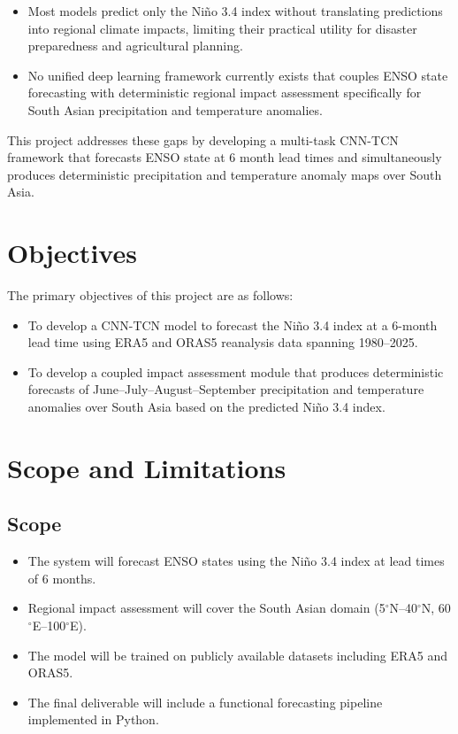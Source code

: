 \begin{itemize}
    \item Most models predict only the Ni\~{n}o 3.4 index 
    without translating predictions into regional climate 
    impacts, limiting their practical utility for 
    disaster preparedness and agricultural planning.
    
    \item No unified deep learning framework currently exists 
    that couples ENSO state forecasting with deterministic 
    regional impact assessment specifically for South Asian 
    precipitation and temperature anomalies.
\end{itemize}

This project addresses these gaps by developing a multi-task 
CNN-TCN framework that forecasts ENSO state at 6 month lead times 
and simultaneously produces deterministic precipitation and 
temperature anomaly maps over South Asia.

\section{Objectives}
The primary objectives of this project are as follows:
\begin{itemize}
    \item To develop a CNN-TCN model to forecast the 
    Ni\~{n}o 3.4 index at a 6-month lead time using 
    ERA5 and ORAS5 reanalysis data spanning 1980--2025.
    
    \item To develop a coupled impact assessment module 
    that produces deterministic forecasts of 
    June--July--August--September precipitation 
    and temperature anomalies over South Asia based on 
    the predicted Ni\~{n}o 3.4 index.
\end{itemize}

\section{Scope and Limitations}

\subsection{Scope}
\begin{itemize}
    \item The system will forecast ENSO states using the Ni\~{n}o 3.4 index at lead times of 6 months.
    \item Regional impact assessment will cover the South Asian domain (5$^{\circ}$N--40$^{\circ}$N, 60$^{\circ}$E--100$^{\circ}$E).
    \item The model will be trained on publicly available datasets including ERA5 and ORAS5.
    \item The final deliverable will include a functional forecasting pipeline implemented in Python.
\end{itemize}

